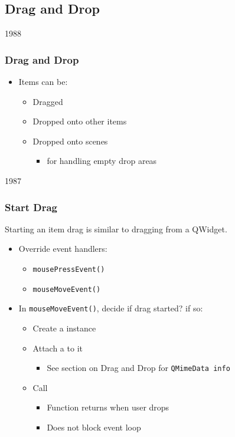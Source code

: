 \subsection{Drag and Drop}
\begin{slide}{1988}


\frametitle{Drag and Drop}
\begin{itemize}
\item Items can be:
    \begin{itemize}
    \item Dragged
    \item Dropped onto other items
    \item Dropped onto scenes
        \begin{itemize}
        \item for handling empty drop areas
        \end{itemize}
    \end{itemize}
\end{itemize}

\end{slide}

\begin{slide}{1987}

\frametitle{Start Drag}
Starting an item drag is similar to dragging from a QWidget.
 \begin{itemize}
 \item Override event handlers:
     \begin{itemize}
     \item \texttt{mousePressEvent()}
     \item \texttt{mouseMoveEvent()}
     \end{itemize}
 \item In \texttt{mouseMoveEvent()}, decide if drag started? if so:
    \begin{itemize}
    \item Create a  instance

    \item Attach a  to it

        \begin{itemize}
        \item See section on Drag and Drop for \texttt{QMimeData info}
        \end{itemize}
    \item Call 

        \begin{itemize}
        \item Function returns when user drops
        \item Does not block event loop
        \end{itemize}
    \end{itemize}
\end{itemize}
\end{slide}

